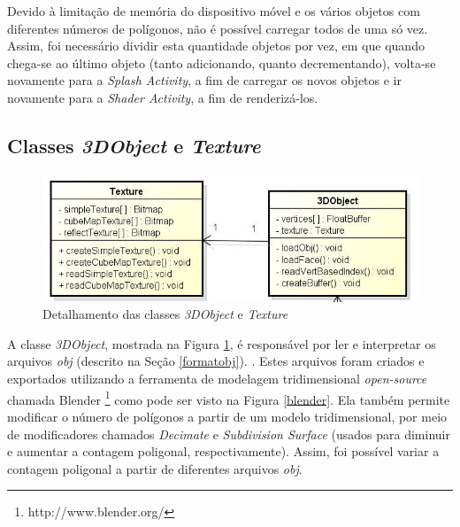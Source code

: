 	Devido à limitação de memória do dispositivo móvel e os vários objetos com diferentes números de polígonos, não é possível carregar todos de uma só vez. Assim, foi necessário dividir esta quantidade objetos por vez, em que quando chega-se ao último objeto (tanto adicionando, quanto decrementando), volta-se novamente para a \textit{Splash Activity}, a fim de carregar os novos objetos e ir novamente para a \textit{Shader Activity}, a fim de renderizá-los.

\subsection{ Classes \textit{3DObject} e \textit{Texture}}   

	\begin{figure}[h]
	\centering
		\includegraphics[keepaspectratio=true,scale=0.6]{figuras/object_texture.jpg}
	\caption{Detalhamento das classes \textit{3DObject} e \textit{Texture}}
	\label{object_texture}
	\end{figure}

	A classe \textit{3DObject}, mostrada na Figura \ref{object_texture}, é responsável por ler e interpretar os arquivos  \textit{obj}  (descrito na Seção \ref{formatobj}). . Estes arquivos foram criados e exportados utilizando a ferramenta de modelagem tridimensional \textit{open-source} chamada Blender \footnote{http://www.blender.org/} como pode ser visto na Figura \ref{blender}. Ela também permite modificar o número de polígonos a partir de um modelo tridimensional, por meio de modificadores chamados \textit{Decimate} e \textit{Subdivision Surface} (usados para diminuir e aumentar a contagem poligonal, respectivamente).  Assim, foi possível variar a contagem poligonal a partir de diferentes arquivos \textit{obj}.

